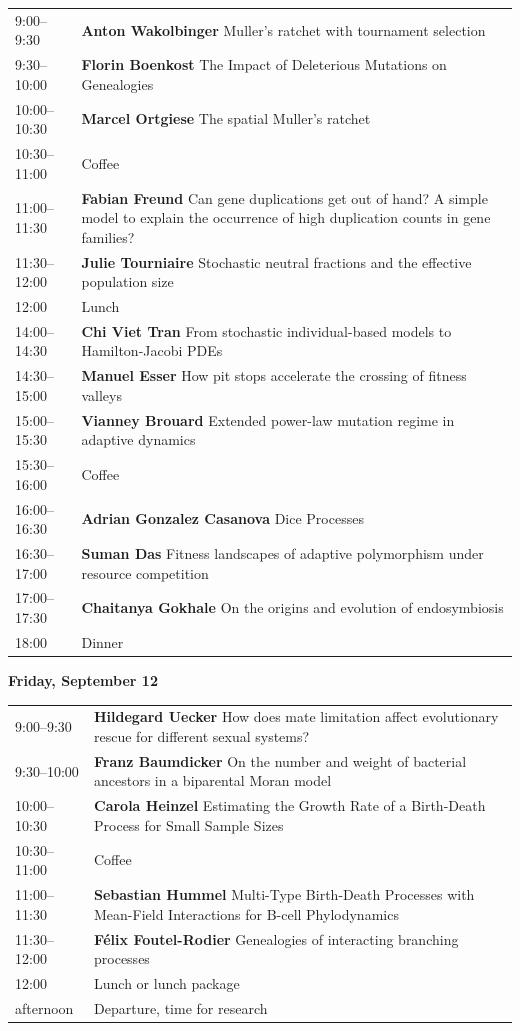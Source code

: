 \documentclass[12pt,a4paper]{article}
\begin{document}
\begin{tabular}{@{}l p{}@{}}
9:00--9:30 &\textbf{Anton Wakolbinger } Muller's ratchet with tournament selection \\
9:30--10:00 &\textbf{Florin Boenkost } The Impact of Deleterious Mutations on Genealogies \\
10:00--10:30 &\textbf{Marcel Ortgiese } The spatial Muller's ratchet \\
10:30--11:00 & Coffee \\
11:00--11:30 &\textbf{Fabian Freund } Can gene duplications get out of hand? A simple model to explain the occurrence of high duplication counts in gene families? \\
11:30--12:00 &\textbf{Julie Tourniaire } Stochastic neutral fractions and the effective population size \\
12:00 & Lunch \\
14:00--14:30 &\textbf{Chi Viet Tran } From stochastic individual-based models to Hamilton-Jacobi PDEs \\
14:30--15:00 &\textbf{Manuel Esser } How pit stops accelerate the crossing of fitness valleys \\
15:00--15:30 &\textbf{Vianney Brouard } Extended power-law mutation regime in adaptive dynamics \\
15:30--16:00 & Coffee \\
16:00--16:30 &\textbf{Adrian Gonzalez Casanova } Dice Processes \\
16:30--17:00 &\textbf{Suman Das } Fitness landscapes of adaptive polymorphism under resource competition \\
17:00--17:30 &\textbf{Chaitanya Gokhale } On the origins and evolution of endosymbiosis \\
18:00 & Dinner \\
\end{tabular}

\newpage
\textbf{\Large Friday, September 12}\medskip

\begin{tabular}{@{}l p{}@{}}
9:00--9:30 &\textbf{Hildegard Uecker } How does mate limitation affect evolutionary rescue for different sexual systems? \\
9:30--10:00 &\textbf{Franz Baumdicker } On the number and weight of bacterial ancestors in a biparental Moran model \\
10:00--10:30 &\textbf{Carola Heinzel } Estimating the Growth Rate of a Birth-Death Process for Small Sample Sizes \\
10:30--11:00 & Coffee \\
11:00--11:30 &\textbf{Sebastian Hummel } Multi-Type Birth-Death Processes with Mean-Field Interactions for B-cell Phylodynamics \\
11:30--12:00 &\textbf{Félix Foutel-Rodier } Genealogies of interacting branching processes \\
12:00 & Lunch or lunch package \\
afternoon & Departure, time for research \\
\end{tabular}
\end{document}
